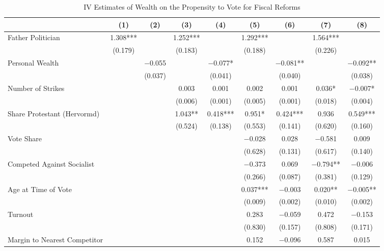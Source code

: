 \begin{table}

\caption{\label{tab:ivresults2}IV Estimates of Wealth on the Propensity to Vote for Fiscal Reforms}
\centering
\begin{tabular}[t]{lcccccccc}
\toprule
  & (1) & (2) & (3) & (4) & (5) & (6) & (7) & (8)\\
\midrule
Father Politician & \num{1.308}*** &  & \num{1.252}*** &  & \num{1.292}*** &  & \num{1.564}*** & \\
 & (\num{0.179}) &  & (\num{0.183}) &  & (\num{0.188}) &  & (\num{0.226}) & \\
Personal Wealth &  & \num{-0.055} &  & \num{-0.077}* &  & \num{-0.081}** &  & \num{-0.092}**\\
 &  & (\num{0.037}) &  & (\num{0.041}) &  & (\num{0.040}) &  & (\num{0.038})\\
Number of Strikes &  &  & \num{0.003} & \num{0.001} & \num{0.002} & \num{0.001} & \num{0.036}* & \num{-0.007}*\\
 &  &  & (\num{0.006}) & (\num{0.001}) & (\num{0.005}) & (\num{0.001}) & (\num{0.018}) & (\num{0.004})\\
Share Protestant (Hervormd) &  &  & \num{1.043}** & \num{0.418}*** & \num{0.951}* & \num{0.424}*** & \num{0.936} & \num{0.549}***\\
 &  &  & (\num{0.524}) & (\num{0.138}) & (\num{0.553}) & (\num{0.141}) & (\num{0.620}) & (\num{0.160})\\
Vote Share &  &  &  &  & \num{-0.028} & \num{0.028} & \num{-0.581} & \num{0.009}\\
 &  &  &  &  & (\num{0.628}) & (\num{0.131}) & (\num{0.617}) & (\num{0.140})\\
Competed Against Socialist &  &  &  &  & \num{-0.373} & \num{0.069} & \num{-0.794}** & \num{-0.006}\\
 &  &  &  &  & (\num{0.266}) & (\num{0.087}) & (\num{0.381}) & (\num{0.129})\\
Age at Time of Vote &  &  &  &  & \num{0.037}*** & \num{-0.003} & \num{0.020}** & \num{-0.005}**\\
 &  &  &  &  & (\num{0.009}) & (\num{0.002}) & (\num{0.010}) & (\num{0.002})\\
Turnout &  &  &  &  & \num{0.283} & \num{-0.059} & \num{0.472} & \num{-0.153}\\
 &  &  &  &  & (\num{0.830}) & (\num{0.157}) & (\num{0.808}) & (\num{0.171})\\
Margin to Nearest Competitor &  &  &  &  & \num{0.152} & \num{-0.096} & \num{0.587} & \num{0.015}\\

\end{tabular}
\end{table}
